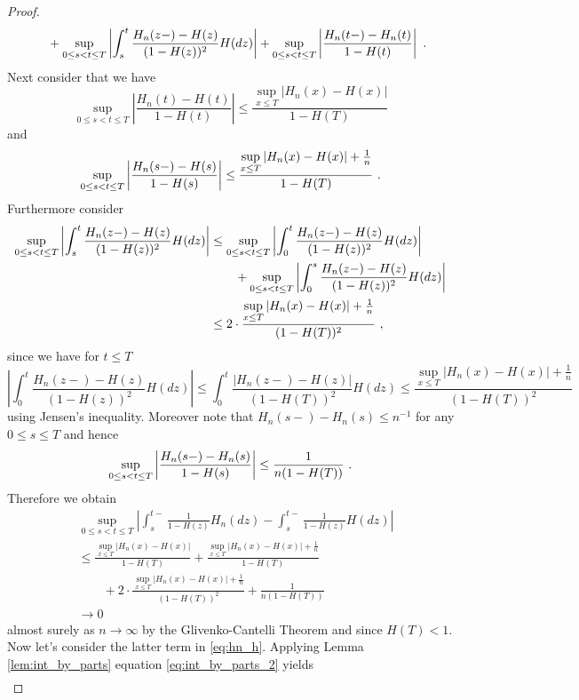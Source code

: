 \begin{lemma}
\begin{proof}
\begin{align*}
		&\qquad + \sup\limits_{0\leq s<t\leq T}\left|\int_s^{t} \frac{H_n(z-) - H(z)}{(1-H(z))^2} H(dz)\right| + \sup\limits_{0\leq s<t\leq T}\left|\frac{H_n(t-) - H_n(t)}{1-H(t)}\right|\textrm{ .}
		\end{align*}
		Next consider that we have
		$$\sup\limits_{0\leq s<t\leq T}\left| \frac{H_n(t) - H(t)}{1-H(t)}\right| \leq \frac{\sup\limits_{x\leq T}\left| H_n(x) - H(x)\right|}{1-H(T)}$$
		and
		$$\sup\limits_{0\leq s<t\leq T}\left| \frac{H_n(s-) - H(s)}{1-H(s)}\right| \leq \frac{\sup\limits_{x\leq T}\left| H_n(x) - H(x)\right| + \frac{1}{n}}{1-H(T)}\textrm{ .}$$
		Furthermore consider
		\begin{align*}
			\sup\limits_{0\leq s<t\leq T}\left|\int_s^{t} \frac{H_n(z-) - H(z)}{(1-H(z))^2} H(dz)\right| &\leq \sup\limits_{0\leq s<t\leq T}\left|\int_0^{t} \frac{H_n(z-) - H(z)}{(1-H(z))^2} H(dz)\right|\\
			&\qquad + \sup\limits_{0\leq s<t\leq T}\left|\int_0^{s} \frac{H_n(z-) - H(z)}{(1-H(z))^2} H(dz)\right|\\
			&\leq 2\cdot \frac{\sup\limits_{x\leq T}\left|H_n(x) - H(x)\right| + \frac{1}{n}}{(1-H(T))^2}\textrm{ ,}
		\end{align*}
		since we have for $t\leq T$
		$$\left|\int_0^{t} \frac{H_n(z-) - H(z)}{(1-H(z))^2} H(dz)\right| \leq \int_0^{t} \frac{\left|H_n(z-) - H(z)\right|}{(1-H(T))^2} H(dz)\leq \frac{\sup\limits_{x\leq T}\left|H_n(x) - H(x)\right| + \frac{1}{n}}{(1-H(T))^2}$$
		using Jensen's inequality. Moreover note that	$H_n(s-) - H_n(s) \leq n^{-1}$ for any $0\leq s \leq T$ and hence
		$$\sup\limits_{0\leq s<t\leq T}\left|\frac{H_n(s-) - H_n(s)}{1-H(s)}\right| \leq \frac{1}{n(1-H(T))}\textrm{ .} $$
		Therefore we obtain
		\begin{align*}
		&\sup\limits_{0\leq s<t\leq T}\left| \int_{s}^{t-} \frac{1}{1-H(z)} H_n(dz) - \int_{s}^{t-} \frac{1}{1-H(z)} H(dz)\right|\\
		&\leq \frac{\sup\limits_{x\leq T}\left| H_n(x) - H(x)\right|}{1-H(T)} + \frac{\sup\limits_{x\leq T}\left| H_n(x) - H(x)\right| + \frac{1}{n}}{1-H(T)} \\
		&\qquad + 2\cdot\frac{\sup\limits_{x\leq T}\left|H_n(x) - H(x)\right| + \frac{1}{n}}{(1-H(T))^2} + \frac{1}{n(1-H(T))}\\
		&\to 0
		\end{align*}
		almost surely as $n\to\infty$ by the Glivenko-Cantelli Theorem and since $H(T)<1$.
		Now let's consider the latter term in \eqref{eq:hn_h}. Applying Lemma \ref{lem:int_by_parts} equation \eqref{eq:int_by_parts_2} yields
		\begin{align*}

\end{align*}
\end{proof}
\end{lemma}
